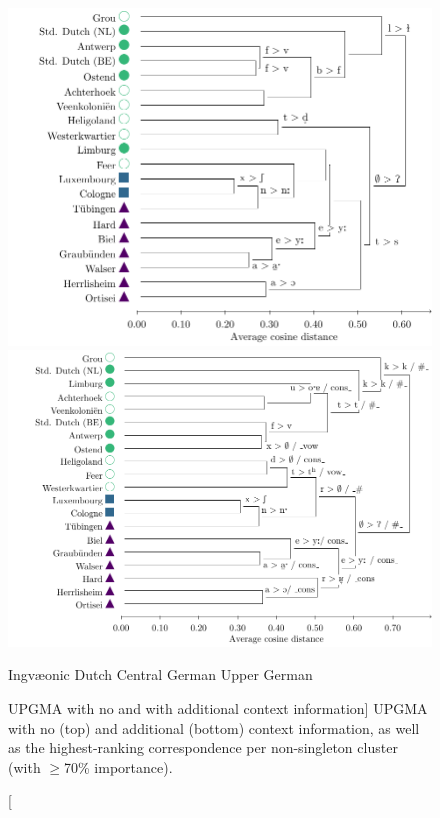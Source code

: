 \documentclass[a4paper]{article}
\def\upper{\color{purple}\FilledBigTriangleUp}
\def\central{\color{midblue}\FilledBigSquare}
\def\dutch{\color{green}\FilledBigCircle}
\def\ingv{\color{green}\BigCircle}
\begin{document}
\begin{figure}[h]
\begin{adjustwidth}{-1cm}{-1cm}
\includegraphics[height=0.45\textheight]{figures/tfidf-nocontext.pdf}\\
\includegraphics[height=0.45\textheight]{figures/tfidf-context.pdf}
\end{adjustwidth}
\vspace{0.3em}
\begin{center}
{\ingv} Ingv\ae{}onic \hspace{1em}
{\dutch} Dutch \hspace{1em}
{\central} Central German \hspace{1em}
{\upper} Upper German
\end{center}
\caption
[UPGMA with no and with additional context information]
{UPGMA with no (top) and additional (bottom) context information,
as well as the highest-ranking correspondence per non-singleton cluster
(with $\geq$70\% importance).}
\label{fig:tfidf-dendrograms}
\end{figure}
\end{document}
